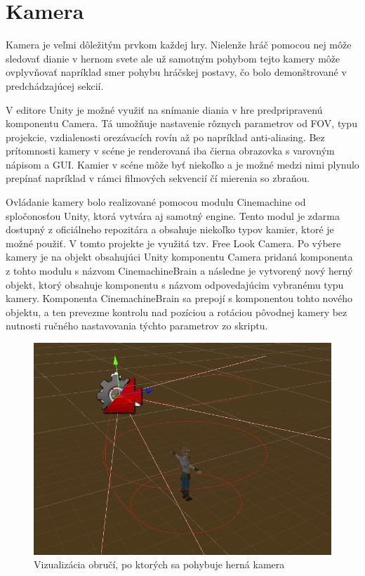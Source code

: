 \documentclass[slovak, master]{diploma}
\begin{document}
\section{Kamera}
\label{sec:Camera}

Kamera je veľmi dôležitým prvkom každej hry. Nielenže hráč pomocou nej môže sledovať dianie v hernom svete ale už samotným pohybom tejto kamery môže ovplyvňovať napríklad smer pohybu hráčskej postavy, čo bolo demonštrované v predchádzajúcej sekcií. 

V editore Unity je možné využiť na snímanie diania v hre predpripravenú komponentu Camera. Tá umožňuje nastavenie rôznych parametrov od FOV, typu projekcie, vzdialenosti orezávacích rovín až po napríklad anti-aliasing. Bez prítomnosti kamery v scéne je renderovaná iba čierna obrazovka s varovným nápisom a GUI. Kamier v scéne môže byť niekoľko a je možné medzi nimi plynulo prepínať napríklad v rámci filmových sekvencií čí mierenia so zbraňou.

Ovládanie kamery bolo realizované pomocou modulu Cinemachine od spločonosťou Unity, ktorá vytvára aj samotný engine. Tento modul je zdarma dostupný z oficiálneho repozitára a obsahuje niekoľko typov kamier, ktoré je možné použiť. V tomto projekte je využitá tzv. Free Look Camera. Po výbere kamery je na objekt obsahujúci Unity komponentu Camera pridaná komponenta z tohto modulu s názvom CinemachineBrain a následne je vytvorený nový herný objekt, ktorý obsahuje komponentu s názvom odpovedajúcim vybranému typu kamery. Komponenta CinemachineBrain sa prepojí s komponentou tohto nového objektu, a ten prevezme kontrolu nad pozíciou a rotáciou pôvodnej kamery bez nutnosti ručného nastavovania týchto parametrov zo skriptu.

\begin{figure}[!htbp]
    \centering
    \includegraphics[width=.7\textwidth]{Figures/obruce.png}
    \caption{Vizualizácia obručí, po ktorých sa pohybuje herná kamera}
    \label{pic:Cinemachine}
\end{figure}
\end{document}

